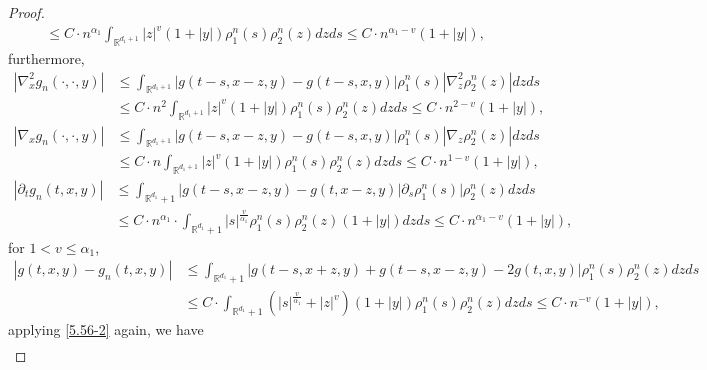 \documentclass[11pt,reqno]{amsart}
\numberwithin{equation}{section}
\begin{document}
\begin{proof}
\begin{equation}
\begin{split}
		&\leq C\cdot n^{\alpha_{1}}\int_{\mathbb{R}^{ d_{1}+1}}	|z|^{v}(1+|y|)\rho_{1}^{n}(s)\rho_{2}^{n}(z)dzds\leq C\cdot n^{\alpha_{1}-v}(1+|y|),
	\end{split}\nonumber
\end{equation}
furthermore,
\begin{equation}
	\begin{split}
		|\nabla_{x}^{2}g_{n}(\cdot,\cdot,y)|&\leq \int_{\mathbb{R}^{ d_{1}+1}}	|g(t-s,x-z,y)-g(t-s,x,y)|\rho_{1}^{n}(s)|\nabla^{2}_{z}\rho_{2}^{n}(z)|dzds\\
		&\leq C\cdot n^{2}\int_{\mathbb{R}^{ d_{1}+1}}	|z|^{v}(1+|y|)\rho_{1}^{n}(s)\rho_{2}^{n}(z)dzds\leq C\cdot n^{2-v}(1+|y|),
	\end{split}\nonumber
\end{equation}
\begin{equation}
	\begin{split}
		|\nabla_{x}g_{n}(\cdot,\cdot,y)|&\leq \int_{\mathbb{R}^{ d_{1}+1}}	|g(t-s,x-z,y)-g(t-s,x,y)|\rho_{1}^{n}(s)|\nabla_{z}\rho_{2}^{n}(z)|dzds\\
		&\leq C\cdot n\int_{\mathbb{R}^{ d_{1}+1}}	|z|^{v}(1+|y|)\rho_{1}^{n}(s)\rho_{2}^{n}(z)dzds\leq C\cdot n^{1-v}(1+|y|),
	\end{split}\nonumber
\end{equation}
\begin{equation}\label{5.L5}
	\begin{split}
		|\partial_{t}g_{n}(t,x,y)|&\leq \int_{\mathbb{R}^{ d_{1}}+1}	|g(t-s,x-z,y)-g(t,x-z,y)|\partial_{s}\rho_{1}^{n}(s)|\rho_{2}^{n}(z)dzds\\
		&\leq C\cdot n^{\alpha_{1}}\cdot\int_{\mathbb{R}^{ d_{1}}+1}|s|^{\frac{v}{\alpha_{1}}}\rho_{1}^{n}(s)\rho_{2}^{n}(z)(1+|y|)dzds\leq C\cdot n^{\alpha_{1}-v}(1+|y|),
	\end{split}
\end{equation}
for $1<v\leq\alpha_{1}$,
\begin{equation}
	\begin{split}
	|g(t,x,y)-g_{n}(t,x,y)|	&\leq \int_{\mathbb{R}^{ d_{1}}+1}	|g(t-s,x+z,y)+g(t-s,x-z,y)-2g(t,x,y)|\rho_{1}^{n}(s)\rho_{2}^{n}(z)dzds\\
		&\leq C\cdot\int_{\mathbb{R}^{ d_{1}}+1}	(|s|^{\frac{v}{\alpha_{1}}}+|z|^{v})(1+|y|)\rho_{1}^{n}(s)\rho_{2}^{n}(z)dzds\leq C\cdot n^{-v}(1+|y|),\nonumber
	\end{split}
\end{equation} 
applying \eqref{5.56-2} again, we have
\begin{equation}
\begin{split}

\end{split}
\end{equation}
\end{proof}
\end{document}
